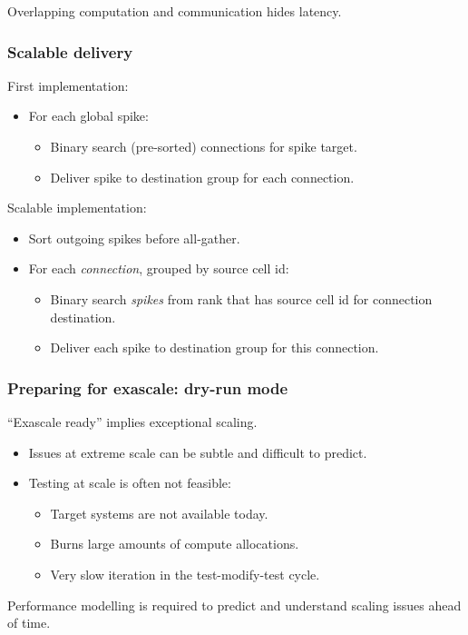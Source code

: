 \documentclass[aspectratio=43,12pt]{beamer}
\begin{document}
\begin{frame}
\vfill
Overlapping computation and communication hides latency.\\
\end{frame}

\begin{frame}
\frametitle{Scalable delivery}

First implementation:
\begin{itemize}
\item For each global spike:
\begin{itemize}
\item Binary search (pre-sorted) connections for spike target.
\item Deliver spike to destination group for each connection.
\end{itemize}
\end{itemize}
\vfill
\pause

Scalable implementation:
\begin{itemize}
\item Sort outgoing spikes before all-gather.
\item For each \emph{connection}, grouped by source cell id:
\begin{itemize}
\item Binary search \emph{spikes} from rank that has source cell id for connection destination.
\item Deliver each spike to destination group for this connection.
\end{itemize}
\end{itemize}


\end{frame}


\begin{frame}
\frametitle{Preparing for exascale: dry-run mode}
\vfill
``Exascale ready'' implies exceptional scaling.
\vfill
\begin{itemize}
    \item Issues at extreme scale can be subtle and difficult to predict.
    \item Testing at scale is often not feasible:
    \begin{itemize}
	\item Target systems are not available today.
	\item Burns large amounts of compute allocations.
	\item Very slow iteration in the test-modify-test cycle.
    \end{itemize}
\end{itemize}
\vfill
Performance modelling is required to predict and understand scaling issues ahead of time.
\vfill
\end{frame}
\end{document}
